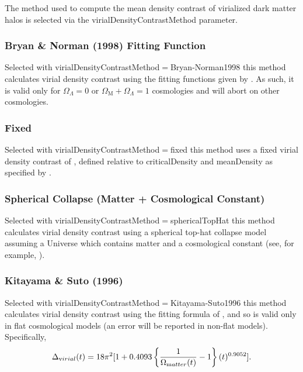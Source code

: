 The method used to compute the mean density contrast of virialized dark matter halos is selected via the {\normalfont \ttfamily virialDensityContrastMethod} parameter.

\subsubsection{Bryan \& Norman (1998) Fitting Function}

Selected with {\normalfont \ttfamily virialDensityContrastMethod}$=${\normalfont \ttfamily Bryan-Norman1998} this method calculates virial density contrast using the fitting functions given by \cite{bryan_statistical_1998}. As such, it is valid only for $\Omega_\Lambda=0$ or $\Omega_{\mathrm M}+\Omega_\Lambda=1$ cosmologies and will abort on other cosmologies.

\subsubsection{Fixed}

Selected with {\normalfont \ttfamily virialDensityContrastMethod}$=${\normalfont \ttfamily fixed} this method uses a fixed virial density contrast of {\normalfont \ttfamily [virialDensityConstrastFixed]}, defined relative to {\normalfont \ttfamily criticalDensity} and {\normalfont \ttfamily meanDensity} as specified by {\normalfont \ttfamily [virialDensityConstrastFixedType]}.

\subsubsection{Spherical Collapse (Matter + Cosmological Constant)}

Selected with {\normalfont \ttfamily virialDensityContrastMethod}$=${\normalfont \ttfamily sphericalTopHat} this method calculates virial density contrast using a spherical top-hat collapse model assuming a Universe which contains matter and a cosmological constant (see, for example, \citealt{percival_cosmological_2005}).

\subsubsection{Kitayama \& Suto (1996)}

Selected with {\normalfont \ttfamily virialDensityContrastMethod}$=${\normalfont \ttfamily Kitayama-Suto1996} this method calculates virial density contrast using the fitting formula of \cite{kitayama_semianalytic_1996}, and so is valid only in flat cosmological models (an error will be reported in non-flat models). Specifically,
\begin{equation}
 \Delta_{\mathrm virial}(t) = 18 \pi^2 [1+0.4093 \left\{{1\over \Omega_{\mathrm matter}(t)}-1\right\}(t)^{0.9052}].
\end{equation}

